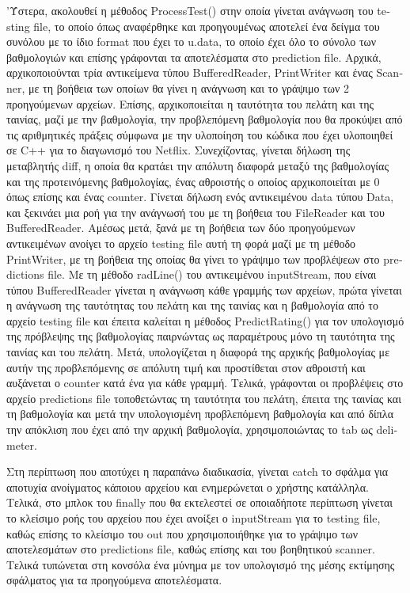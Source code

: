 \documentclass{report}
\begin{document}
'Ύστερα, ακολουθεί η μέθοδος \textlatin{ProcessTest}() στην οποία γίνεται ανάγνωση του \textlatin{testing file}, το οποίο όπως αναφέρθηκε και προηγουμένως αποτελεί ένα δείγμα του συνόλου με το ίδιο \textlatin{format} που έχει το \textlatin{u.data}, το οποίο έχει όλο το σύνολο των βαθμολογιών και επίσης γράφονται τα αποτελέσματα στο \textlatin{prediction file}. Αρχικά, αρχικοποιούνται τρία αντικείμενα τύπου \textlatin{BufferedReader}, \textlatin{PrintWriter} και ένας \textlatin{Scanner}, με τη βοήθεια των οποίων θα γίνει η ανάγνωση και το γράψιμο των 2 προηγούμενων αρχείων. Επίσης, αρχικοποιείται η ταυτότητα του πελάτη και της ταινίας, μαζί με την βαθμολογία, την προβλεπόμενη βαθμολογία που θα προκύψει από τις αριθμητικές πράξεις σύμφωνα με την υλοποίηση του κώδικα που έχει υλοποιηθεί σε \textlatin{C++} για το διαγωνισμό του \textlatin{Netflix}. Συνεχίζοντας, γίνεται δήλωση της μεταβλητής \textlatin{diff}, η οποία θα κρατάει την απόλυτη διαφορά μεταξύ της βαθμολογίας και της προτεινόμενης βαθμολογίας, ένας αθροιστής ο οποίος αρχικοποιείται με 0 όπως επίσης και ένας \textlatin{counter}. Γίνεται δήλωση ενός αντικειμένου \textlatin{data} τύπου \textlatin{Data}, και ξεκινάει μια ροή για την ανάγνωσή του με τη βοήθεια του \textlatin{FileReader} και του \textlatin{BufferedReader}. Αμέσως μετά, ξανά με τη βοήθεια των δύο προηγούμενων αντικειμένων ανοίγει το αρχείο \textlatin{testing file} αυτή τη φορά μαζί με τη μέθοδο \textlatin{PrintWriter}, με τη βοήθεια της οποίας θα γίνει το γράψιμο των προβλέψεων στο \textlatin{predictions file}. Με τη μέθοδο \textlatin{radLine}() του αντικειμένου \textlatin{inputStream}, που είναι  τύπου \textlatin{BufferedReader} γίνεται η ανάγνωση κάθε γραμμής των αρχείων, πρώτα γίνεται η ανάγνωση της ταυτότητας του πελάτη και της ταινίας και η βαθμολογία από το αρχείο \textlatin{testing file} και έπειτα καλείται η μέθοδος \textlatin{PredictRating}() για τον υπολογισμό της πρόβλεψης της βαθμολογίας παιρνώντας ως παραμέτρους μόνο τη ταυτότητα της ταινίας και του πελάτη. Μετά, υπολογίζεται η διαφορά της αρχικής βαθμολογίας με αυτήν της προβλεπόμενης σε απόλυτη τιμή και προστίθεται στον αθροιστή και αυξάνεται ο \textlatin{counter} κατά ένα για κάθε γραμμή. Τελικά, γράφονται οι προβλέψεις στο αρχείο \textlatin{predictions file} τοποθετώντας τη ταυτότητα του πελάτη, έπειτα της ταινίας και τη βαθμολογία και μετά την υπολογισμένη προβλεπόμενη βαθμολογία και από δίπλα την απόκλιση που έχει από την αρχική βαθμολογία, χρησιμοποιώντας το \textlatin{tab} ως \textlatin{delimeter}.

Στη περίπτωση που αποτύχει η παραπάνω διαδικασία, γίνεται \textlatin{catch} το σφάλμα για αποτυχία ανοίγματος κάποιου αρχείου και ενημερώνεται ο χρήστης κατάλληλα. Τελικά, στο μπλοκ του \textlatin{finally} που θα εκτελεστεί σε οποιαδήποτε περίπτωση γίνεται το κλείσιμο ροής του αρχείου που έχει ανοίξει ο \textlatin{inputStream} για το \textlatin{testing file}, καθώς επίσης το κλείσιμο του \textlatin{out} που χρησιμοποιήθηκε για το γράψιμο των αποτελεσμάτων στο \textlatin{predictions file}, καθώς επίσης και του βοηθητικού \textlatin{scanner}. Τελικά τυπώνεται στη κονσόλα ένα μύνημα με τον υπολογισμό της μέσης εκτίμησης σφάλματος για τα προηγούμενα αποτελέσματα.   
\end{document}
